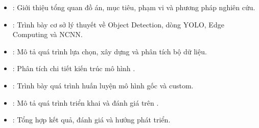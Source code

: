 \begin{itemize}
    \item \textbf{}: Giới thiệu tổng quan đồ án, mục tiêu, phạm vi và phương pháp nghiên cứu.
    \item \textbf{}: Trình bày cơ sở lý thuyết về Object Detection, dòng YOLO, Edge Computing và NCNN.
    \item \textbf{}: Mô tả quá trình lựa chọn, xây dựng và phân tích bộ dữ liệu.
    \item \textbf{}: Phân tích chi tiết kiến trúc mô hình \yolo.
    \item \textbf{}: Trình bày quá trình huấn luyện mô hình gốc và custom.
    \item \textbf{}: Mô tả quá trình triển khai và đánh giá trên \rpi.
    \item \textbf{}: Tổng hợp kết quả, đánh giá và hướng phát triển.
\end{itemize}
